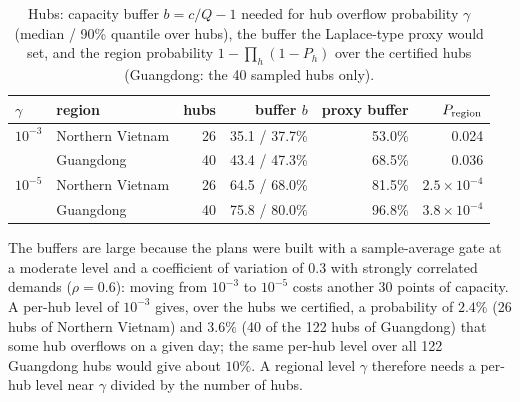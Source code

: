 \documentclass[ijoc,sglanonrev]{informs4}
\begin{document}
\begin{table}[t]
\centering\small
\caption{Hubs: capacity buffer $b=c/Q-1$ needed for hub overflow probability
$\gamma$ (median / 90\% quantile over hubs), the buffer the Laplace-type proxy
would set, and the region probability $1-\prod_h(1-P_h)$ over the certified
hubs (Guangdong: the 40 sampled hubs only).}
\label{tab:hubs}
\begin{tabular}{llrrrr}
\toprule
$\gamma$ & region & hubs & buffer $b$ & proxy buffer & $P_{\rm region}$ \\
\midrule
$10^{-3}$ & Northern Vietnam & 26 & 35.1 / 37.7\% & 53.0\% & 0.024 \\
 & Guangdong & 40 & 43.4 / 47.3\% & 68.5\% & 0.036 \\
$10^{-5}$ & Northern Vietnam & 26 & 64.5 / 68.0\% & 81.5\% & $2.5\times10^{-4}$ \\
 & Guangdong & 40 & 75.8 / 80.0\% & 96.8\% & $3.8\times10^{-4}$ \\
\bottomrule
\end{tabular}
\end{table}

The buffers are large because the plans were built with a sample-average
gate at a moderate level and a coefficient of variation of $0.3$ with
strongly correlated demands ($\rho=0.6$): moving from $10^{-3}$ to $10^{-5}$
costs another $30$ points of capacity. A per-hub level of $10^{-3}$ gives, over the hubs we certified,
a probability of $2.4\%$ (26 hubs of Northern Vietnam) and $3.6\%$ (40 of the
122 hubs of Guangdong) that some hub overflows on a given day; the same
per-hub level over all 122 Guangdong hubs would give about $10\%$. A regional
level $\gamma$ therefore needs a per-hub level near $\gamma$ divided by the
number of hubs.
\end{document}

